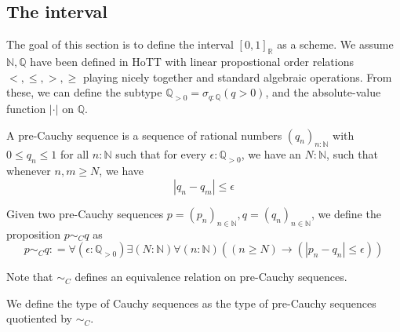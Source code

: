 \subsection{The interval}
The goal of this section is to define the interval $[0,1]_\mathbb R$ as a scheme. 
We assume $\mathbb N, \mathbb Q$ have been defined in HoTT
with linear propostional order relations $<,\leq, > ,\geq$ playing nicely together 
and standard algebraic operations. 
From these, we can define the subtype $\mathbb Q_{>0}=\sigma _{q : \mathbb Q} (q>0)$, 
and the absolute-value function $|\cdot|$ on $\mathbb Q$. 

\begin{definition}
  A pre-Cauchy sequence is a sequence of rational numbers $(q_n)_{n: \mathbb N}$ with $0 \leq q_n \leq 1$ 
  for all $n:\mathbb N$
  such that for every $\epsilon: \mathbb Q_{>0}$, we have an $N:\mathbb N$, 
  such that whenever $n,m \geq N$, we have 
\begin{equation}
  | q_n - q_m | \leq \epsilon
\end{equation} 
\end{definition}

\begin{definition}
Given two pre-Cauchy sequences $p = (p_n)_{n\in\mathbb N}, q=(q_n)_{n\in\mathbb N}$, 
we define the proposition $p \sim_C  q$ as 
\begin{equation}
  p \sim_C q : = \forall (\epsilon : \mathbb Q_{>0} )\exists ( N :\mathbb N) \forall (n : \mathbb N) ((n \geq N) \to 
  (| p_n - q_n| \leq  \epsilon))
\end{equation}
\end{definition}
Note that $\sim_C$ defines an equivalence relation on pre-Cauchy sequences. 
\begin{definition}
We define the type of Cauchy sequences as the type of pre-Cauchy sequences quotiented by $\sim_C$. 
\end{definition}

